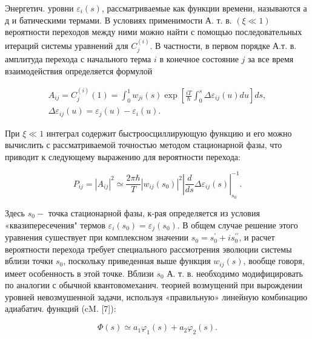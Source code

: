 \documentclass[10pt]{article}
\begin{document}
Энергетич. уровни $\varepsilon_{i}(s)$, рассматриваемые как функции времени, называются а д и батическими термами. В условиях применимости А. т. в. $(\xi \ll 1)$ вероятности переходов между ними можно найти с помощью последовательных итераций системы уравнений для $C_{j}^{(i)}$. В частности, в первом порядке А.т. в. амплитуда перехода с начального терма $i$ в конечное состояние $j$ за все время взаимодействия определяется формулой



\[

\begin{gathered}

A_{i j}=C_{j}^{(i)}(1)=\int_{0}^{1} w_{j i}(s) \exp \left[\frac{i T}{\hbar} \int_{0}^{s} \Delta \varepsilon_{i j}(u) d u\right] d s, \\

\Delta \varepsilon_{i j}(u)=\varepsilon_{j}(u)-\varepsilon_{i}(u) .

\end{gathered}

\]



При $\xi \ll 1$ интеграл содержит быстроосциллирующую функцию и его можно вычислить с рассматриваемой точностью методом стационарной фазы, что приводит к следующему выражению для вероятности перехода:



\[

P_{i j}=\left|A_{i j}\right|^{2} \simeq \frac{2 \pi \hbar}{T}\left|w_{i j}\left(s_{0}\right)\right|^{2}\left|\frac{d}{d s} \Delta \varepsilon_{i j}(s)\right|_{s_{0}}^{-1} .

\]



Здесь $s_{0}-$ точка стационарной фазы, к-рая определяется из условия «квазипересечения" термов $\varepsilon_{i}\left(s_{0}\right)=\varepsilon_{j}\left(s_{0}\right)$. В общем случае решение этого уравнения сушествует при комплексном значении $s_{0}=s_{0}^{\prime}+i s_{0}^{\prime \prime}$, и расчет вероятности перехода требует специального рассмотрения эволюции системы вблизи точки $s_{0}$, поскольку приведенная выше функция $w_{i j}(s)$, вообще говоря, имеет особенность в этой точке. Вблизи $s_{0}$ А. т. в. необходимо модифицировать по аналогии с обычной квантовомеханич. теорией возмущений при вырождении уровней невозмушенной задачи, используя «правильную» линейную комбинацию адиабатич. функций (cM. [7]):



\[

\Phi(s) \simeq a_{1} \varphi_{1}(s)+a_{2} \varphi_{2}(s) .

\]
\end{document}
